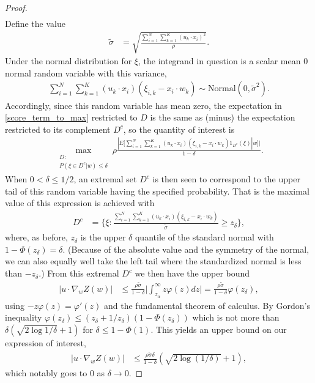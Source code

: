 \documentclass{article}
\numberwithin{equation}{section}
\theoremstyle{Lemma}
\theoremstyle{Corollary}
\theoremstyle{Theorem}
\theoremstyle{Remark}
\begin{document}
\begin{proof}
\begin{align}
    \end{align}
     Define the value
    \begin{align}
        \tilde{\sigma}&= \sqrt{\frac{\sum_{i=1}^{N}\sum_{k=1}^{K}(u_{k}\cdot x_{i})^{2}}{\rho}}.
    \end{align}
    Under the normal distribution for $\xi$, the integrand in question is a scalar mean 0 normal random variable with this variance,
    \begin{align}
        \sum_{i=1}^{N}\sum_{k=1}^{K}(u_{k}\cdot x_{i})(\xi_{i,k} - x_{i}\cdot w_{k}) \sim \text{Normal}(0,\tilde{\sigma}^{2}).
    \end{align}
Accordingly, since this random variable has mean zero, the expectation in \eqref{score_term_to_max} restricted to $D$ is the same as (minus) the expectation restricted to its complement $D^c$, so the quantity of interest is
   \begin{align}
    \max_{\substack{D:\\ P(\xi \in D^c|w) \leq \delta}} \rho\frac{|E[\sum_{i=1}^{N}\sum_{k=1}^{K}(u_{k}\cdot x_{i})(\xi_{i,k} - x_{i}\cdot w_{k})1_{D^c}(\xi)|w]|}{1-\delta}.
    \end{align}
When $0<\delta \le 1/2$, an extremal set $D^c$ is then seen to correspond to the upper tail of this random variable having the specified probability. That is the maximal value of this expression is achieved with
    \begin{align}
        D^{c}&= \{\xi: \frac{\sum_{i=1}^{N}\sum_{k=1}^{K}(u_{k}\cdot x_{i})(\xi_{i,k} - x_{i}\cdot w_{k})}{\tilde{\sigma}} \geq z_\delta\},\label{d_star_1}
    \end{align}
where, as before, $z_\delta$ is the upper $\delta$ quantile of the standard normal with $1-\Phi(z_\delta)= \delta$.
(Because of the absolute value and the symmetry of the normal, we can also equally well take the left tail where the standardized normal is less than $- z_\delta$.)
From this extremal $D^c$ we then have the upper bound
    \begin{align}
        |u\cdot \nabla_{w}Z(w)|& \leq \frac{\rho \tilde{\sigma}}{1-\delta} \Big|\int_{z_\alpha}^\infty z \varphi(z)dz\Big|=\frac{\rho \tilde{\sigma}}{1-\delta} \varphi(z_\delta),
    \end{align}
using $-z\varphi(z) = \varphi'(z)$ and the fundamental theorem of calculus. By Gordon's inequality $\varphi(z_\delta) \le (z_\delta+1/z_\delta) (1-\Phi(z_\delta))$ which is not more than $\delta (\sqrt{2 \log 1/\delta} + 1)$ for $\delta \le 1-\Phi(1)$.  This yields an upper bound on our expression of interest,
    \begin{align}
 |u\cdot \nabla_{w}Z(w)|&\leq 
\frac{\rho \tilde{\sigma} \delta}{1-\delta} (\sqrt{2 \log (1/\delta)} + 1),
    \end{align}
 which notably goes to 0 as $\delta \to 0$.
    

\end{proof}
\end{document}
